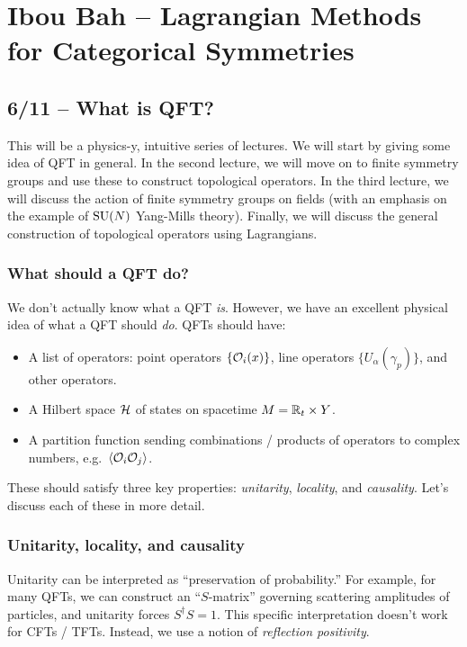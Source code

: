 \chapter{Ibou Bah -- Lagrangian Methods for Categorical Symmetries}

\section{6/11 -- What is QFT?}

This will be a physics-y, intuitive series of lectures.
We will start by giving some idea of QFT in general.
In the second lecture, we will move on to finite symmetry groups and use these to construct topological operators.
In the third lecture, we will discuss the action of finite symmetry groups on fields (with an emphasis on the example of $\mathrm{SU}(N)$ Yang-Mills theory).
Finally, we will discuss the general construction of topological operators using Lagrangians.

\subsection{What should a QFT do?}

We don't actually know what a QFT \emph{is}.
However, we have an excellent physical idea of what a QFT should \emph{do}.
QFTs should have:
\begin{itemize}
	\item A list of operators: point operators $\{ \mathcal{O}_i(x) \}$, line operators $\{ U_\alpha(\gamma_p) \}$, and other operators.
	\item A Hilbert space $\mathcal{H}$ of states on spacetime $M = \mathbb{R}_t \times Y$.
	\item A partition function sending combinations / products of operators to complex numbers, e.g.\ $\langle \mathcal{O}_i \mathcal{O}_j \rangle$.
\end{itemize}
These should satisfy three key properties: \emph{unitarity}, \emph{locality}, and \emph{causality}. 
Let's discuss each of these in more detail.

\subsection{Unitarity, locality, and causality}

Unitarity can be interpreted as ``preservation of probability.''
For example, for many QFTs, we can construct an ``$S$-matrix'' governing scattering amplitudes of particles, and unitarity forces $S^\dagger S = 1$.
This specific interpretation doesn't work for CFTs / TFTs.
Instead, we use a notion of \emph{reflection positivity}.

